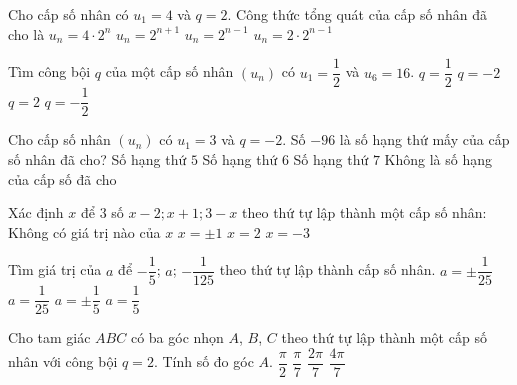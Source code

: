 \begin{ex}%
 Cho cấp số nhân có $u_1=4$ và $q=2$. Công thức tổng quát của cấp số nhân đã cho là
 \choice
 {$u_n=4\cdot 2^n$}
 {\True $u_n=2^{n+1}$}
 {$u_n=2^{n-1}$}
 {$u_n=2\cdot 2^{n-1}$}
\end{ex}
\begin{ex}%
 Tìm công bội $q$ của một cấp số nhân $(u_n)$ có $u_1=\dfrac{1}{2}$ và $u_6=16$.
 \choice
 {$q=\dfrac{1}{2}$}
 {$q=-2$}
 {\True $q=2$}
 {$q=-\dfrac{1}{2}$}
\end{ex}
\begin{ex}%
 Cho cấp số nhân $(u_n)$ có $u_1=3$ và $q=-2$. Số $-96$ là số hạng thứ mấy của cấp số nhân đã cho?
 \choice
 {Số hạng thứ $5$}
 {\True Số hạng thứ $6$}
 {Số hạng thứ $7$}
 {Không là số hạng của cấp số đã cho}
\end{ex}
\begin{ex}%
 Xác định $x$ để $3$ số $x-2; x+1; 3-x$ theo thứ tự lập thành một cấp số nhân:
 \choice
 {\True Không có giá trị nào của $x$}
 {$x=\pm 1$}
 {$x=2$}
 {$x=-3$}
\end{ex}
\begin{ex}%
 Tìm giá trị của $a$ để $-\dfrac{1}{5}$; $a$; $-\dfrac{1}{125}$ theo thứ tự lập thành cấp số nhân.
 \choice
 {\True $a=\pm \dfrac{1}{25}$}
 {$a=\dfrac{1}{25}$}
 {$a=\pm \dfrac{1}{5}$}
 {$a=\dfrac{1}{5}$}
\end{ex}
\begin{ex}%
 Cho tam giác $ABC$ có ba góc nhọn $A$, $B$, $C$ theo thứ tự lập thành một cấp số nhân với công bội $q=2$. Tính số đo góc $A$.
 \choice
 {$\dfrac{\pi}{2}$}
 {\True $\dfrac{\pi}{7}$}
 {$\dfrac{2\pi}{7}$}
 {$\dfrac{4\pi}{7}$}
\end{ex}

